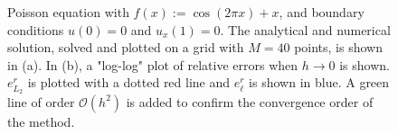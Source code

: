 \begin{figure}
\centering
{}\hspace{0mm}
\hspace{0mm}
\caption{Poisson equation with $f(x) := \cos{(2\pi x)} + x$, and boundary conditions $u(0) = 0$ and $u_x(1) = 0$. The analytical and numerical solution, solved and plotted on a grid with $M = 40$ points, is shown in (a). In (b), a "log-log" plot of relative errors when $h \rightarrow 0$ is shown.  $e^r_{L_2}$ is plotted with a dotted red line and $e^r_\ell$ is shown in blue. A green line of order $\mathcal{O}(h^2)$ is added to confirm the convergence order of the method. }
\end{figure}


